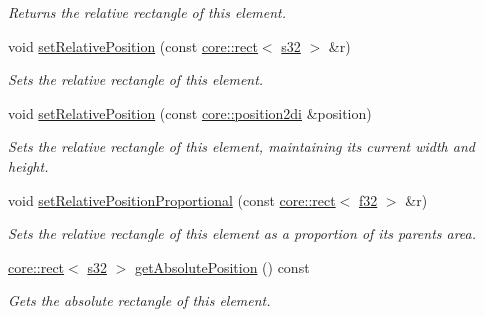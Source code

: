 \begin{DoxyCompactItemize}
\begin{DoxyCompactList}\small\item\em Returns the relative rectangle of this element. \end{DoxyCompactList}\item 
void \hyperlink{classirr_1_1gui_1_1IGUIElement_a0e5bb2d0a2e88e30d3697652f8dd7034}{set\+Relative\+Position} (const \hyperlink{classirr_1_1core_1_1rect}{core\+::rect}$<$ \hyperlink{namespaceirr_ac66849b7a6ed16e30ebede579f9b47c6}{s32} $>$ \&r)
\begin{DoxyCompactList}\small\item\em Sets the relative rectangle of this element. \end{DoxyCompactList}\item 
void \hyperlink{classirr_1_1gui_1_1IGUIElement_aba1cfc75daa28e53a021faa2d954b79b}{set\+Relative\+Position} (const \hyperlink{namespaceirr_1_1core_a3643c2cc7820dd78cd87e73a46b92145}{core\+::position2di} \&position)
\begin{DoxyCompactList}\small\item\em Sets the relative rectangle of this element, maintaining its current width and height. \end{DoxyCompactList}\item 
void \hyperlink{classirr_1_1gui_1_1IGUIElement_aa67e02ab54db1068e7c057721d2f24a5}{set\+Relative\+Position\+Proportional} (const \hyperlink{classirr_1_1core_1_1rect}{core\+::rect}$<$ \hyperlink{namespaceirr_a0277be98d67dc26ff93b1a6a1d086b07}{f32} $>$ \&r)
\begin{DoxyCompactList}\small\item\em Sets the relative rectangle of this element as a proportion of its parent\textquotesingle{}s area. \end{DoxyCompactList}\item 
\mbox{\label{classirr_1_1gui_1_1IGUIElement_a6c5b94dd889533a306a03e25d0998bdf}} 
\hyperlink{classirr_1_1core_1_1rect}{core\+::rect}$<$ \hyperlink{namespaceirr_ac66849b7a6ed16e30ebede579f9b47c6}{s32} $>$ \hyperlink{classirr_1_1gui_1_1IGUIElement_a6c5b94dd889533a306a03e25d0998bdf}{get\+Absolute\+Position} () const
\begin{DoxyCompactList}\small\item\em Gets the absolute rectangle of this element. \end{DoxyCompactList}\item 
\mbox{\label{classirr_1_1gui_1_1IGUIElement_ad06166ccb3e9c86f17bd2a6cfc627eba}} 

\end{DoxyCompactItemize}
